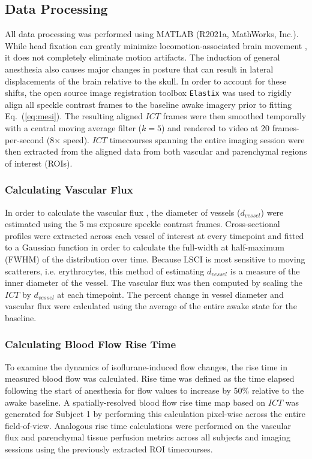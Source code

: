 \documentclass[review]{elsarticle}
\begin{document}

\subsection{Data Processing}

All data processing was performed using MATLAB (R2021a, MathWorks, Inc.). While head fixation can greatly minimize locomotion-associated brain movement \cite{Dombeck:2007gr}, it does not completely eliminate motion artifacts. The induction of general anesthesia also causes major changes in posture that can result in lateral displacements of the brain relative to the skull. In order to account for these shifts, the open source image registration toolbox \texttt{Elastix} \cite{Klein:2010gr} was used to rigidly align all speckle contrast frames to the baseline awake imagery prior to fitting Eq.~(\ref{eq:mesi}). The resulting aligned $ICT$ frames were then smoothed temporally with a central moving average filter ($k=5$) and rendered to video at 20 frames-per-second (8$\times$ speed). $ICT$ timecourses spanning the entire imaging session were then extracted from the aligned data from both vascular and parenchymal regions of interest (ROIs).

\subsubsection{Calculating Vascular Flux}
In order to calculate the vascular flux \cite{Kazmi:2015du}, the diameter of vessels ($d_{vessel}$) were estimated using the 5 ms exposure speckle contrast frames. Cross-sectional profiles were extracted across each vessel of interest at every timepoint and fitted to a Gaussian function in order to calculate the full-width at half-maximum (FWHM) of the distribution over time. Because LSCI is most sensitive to moving scatterers, i.e. erythrocytes, this method of estimating $d_{vessel}$ is a measure of the inner diameter of the vessel. The vascular flux was then computed by scaling the $ICT$ by $d_{vessel}$ at each timepoint. The percent change in vessel diameter and vascular flux were calculated using the average of the entire awake state for the baseline.

\subsubsection{Calculating Blood Flow Rise Time}
To examine the dynamics of isoflurane-induced flow changes, the rise time in measured blood flow was calculated. Rise time was defined as the time elapsed following the start of anesthesia for flow values to increase by 50\% relative to the awake baseline. A spatially-resolved blood flow rise time map based on $ICT$ was generated for Subject 1 by performing this calculation pixel-wise across the entire field-of-view. Analogous rise time calculations were performed on the vascular flux and parenchymal tissue perfusion metrics across all subjects and imaging sessions using the previously extracted ROI timecourses.
\end{document}
